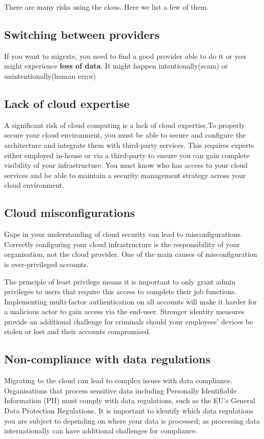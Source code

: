 \documentclass[a4paper,12pt]{book}
\begin{document}
There are many risks using the clous. Here we list a few of them.

\subsection{Switching between providers} \flushleft
If you want to migrate, you need to find a good provider able to do it or you might experience \textbf{loss of data}. It might happen intentionally(scam) or unintentionally(human error)


\subsection{Lack of cloud expertise}

A significant risk of cloud computing is a lack of cloud expertise.To properly secure your cloud environment, you must be able to  secure and configure the architecture and integrate them with third-party services. This requires experts either employed in-house or via a third-party to ensure you can gain complete visibility of your infrastructure. You must know who has access to your cloud services and be able to maintain a security management strategy across your cloud environment.


\subsection{Cloud misconfigurations}

Gaps in your understanding of cloud security can lead to misconfigurations. Correctly configuring your cloud infrastructure is the responsibility of your organisation, not the cloud provider. One of the main causes of misconfiguration is over-privileged accounts. 

The principle of least privilege means it is important to only grant admin privileges to users that require this access to complete their job functions. Implementing multi-factor authentication on all accounts will make it harder for a malicious actor to gain access via the end-user. Stronger identity measures provide an additional challenge for criminals should your employees’ devices be stolen or lost and their accounts compromised.


\subsection{Non-compliance with data regulations}

Migrating to the cloud can lead to complex issues with data compliance. Organisations that process sensitive data including Personally Identifiable Information (PII) must comply with data regulations, such as the EU’s General Data Protection Regulations. It is important to identify which data regulations you are subject to depending on where your data is processed; as processing data internationally can have additional challenges for compliance.
\end{document}
